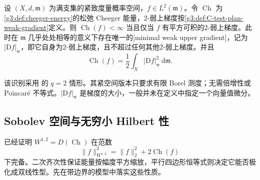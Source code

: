 \begin{theorem}\label{g3:thm:C-weak-cheeger-identification}
	设 \((X,d,\mathfrak m)\) 为满支集的紧致度量概率空间，\(f\in L^2(\mathfrak m)\)。令 \(\operatorname{Ch}\) 为\cref{g3:def:cheeger-energy}的松弛 Cheeger 能量，2-弱上梯度按\cref{g3:def:C-test-plan-weak-gradient}定义。则 \(\operatorname{Ch}(f)<\infty\) 当且仅当 \(f\) 有平方可积的2-弱上梯度。此时在 \(\mathfrak m\) 几乎处处相等的意义下存在唯一的[minimal weak upper gradient]，记为 \(|\mathrm Df|_{\mathrm w}\)，即它自身为2-弱上梯度，且不超过任何其他2-弱上梯度。并且
	\begin{equation}\label{g3:eq:C-cheeger-weak-gradient}
		\operatorname{Ch}(f)=\frac12\int_X|\mathrm Df|_{\mathrm w}^2\,\mathrm d\mathfrak m.
	\end{equation}
\end{theorem}
该识别采用 \cite[定义4.11，第982页；定理7.4，第992页]{AmbrosioGigliSavare2013WeakGradients} 的 \(q=2\) 情形。其紧空间版本只要求有限 Borel 测度；无需倍增性或 Poincaré 不等式。\(|\mathrm Df|_{\mathrm w}\) 是梯度的大小，一般并未在定义中指定一个向量值微分。

\subsection{Sobolev 空间与无穷小 Hilbert 性}
\label{g3:subsec:C02:02}
已经证明 \(W^{1,2}=D(\operatorname{Ch})\) 在范数
\[
	\|f\|_{W^{1,2}}^2=\|f\|_2^2+2\operatorname{Ch}(f)
\]
下完备。二次齐次性保证能量按幅度平方缩放，平行四边形恒等式则决定它能否极化成双线性型。先在带边界的模型中落实这些性质。

